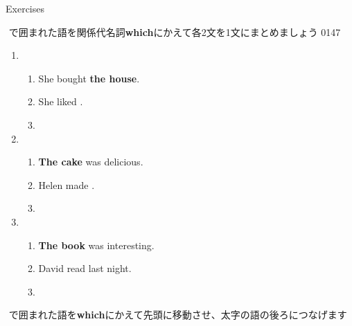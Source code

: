 \documentclass[aspectratio=169,xcolor={dvipsnames,table}]{beamer}
\begin{document}
\begin{frame}[plain]{Exercises}

{\small \fbox{　　}\,\,で囲まれた語を関係代名詞\textbf{which}にかえて各2文を1文にまとめましょう}%
\hfill{\tiny 0147}\,{\scriptsize {}}
\begin{enumerate}
 \item \begin{enumerate}
	\item She bought {\bfseries the house}.
	\item She liked .
	\item {}
       \end{enumerate} \item \begin{enumerate}
	\item {\bfseries The cake} was delicious.
	\item Helen made .
	\item {}
       \end{enumerate}

 \item \begin{enumerate}
	\item {\bfseries The book} was interesting.
	\item David read  last night.
	\item {}
       \end{enumerate}
\end{enumerate} 

\hfill{\scriptsize \fbox{　　}\,\,で囲まれた語を\textbf{which}にかえて先頭に移動させ、太字の語の後ろにつなげます}
\end{frame}
\end{document}
